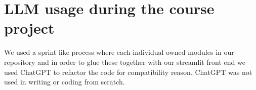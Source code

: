 \documentclass{article}
\begin{document}
\section{LLM usage during the course project}
We used a sprint like process where each individual owned modules in our repository and in order to glue these together with our streamlit front end we used ChatGPT to refactor the code for compatibility reason. ChatGPT was not used in writing or coding from scratch.
\end{document}
